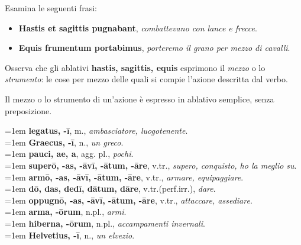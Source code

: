 \documentclass[nols]{tufte-handout}
\newcommand{\textls}[2][5]{%
    \begingroup\addfontfeatures{LetterSpace=#1}#2\endgroup
  }
\renewcommand{\smallcapsspacing}[1]{\textls[10]{#1}}
\renewcommand{\textsc}[1]{\smallcapsspacing{\textsmallcaps{#1}}}
\begin{document}
 Esamina le seguenti frasi:
\begin{itemize}
\item[\textsc{1.}] \textbf{Hastis et sagittis pugnabant}, \textit{combattevano con lance e frecce}.  
\item[\textsc{2.}] \textbf{Equis frumentum portabimus}, \textit{porteremo il grano per mezzo di cavalli}.  
\end{itemize}

Osserva che gli ablativi \textbf{hastis, sagittis, equis} esprimono il \textit{mezzo} o lo \textit{strumento}: 
le cose per mezzo delle quali si compie l'azione descritta dal verbo. 

 Il mezzo o lo strumento di un'azione è espresso in ablativo semplice, senza preposizione.



\begin{multicols}{2}
    \noindent \hangindent=1em \textbf{legatus, -ī}, m., \textit{ambasciatore, luogotenente}.  \\
    \noindent \hangindent=1em \textbf{Graecus, -ī}, n., \textit{un greco}.  \\
    \noindent \hangindent=1em \textbf{pauci, ae, a}, agg. pl., \textit{pochi}.  \\
	
	\noindent \hangindent=1em \textbf{superō, -as, -āvī, -ātum, -āre}, v.tr., \textit{supero, conquisto, ho la meglio su}.  \\
	\noindent \hangindent=1em \textbf{armō, -as, -āvī, -ātum, -āre}, v.tr., \textit{armare, equipaggiare}.  \\
	\noindent \hangindent=1em \textbf{dō, das, dedī, dātum, dāre}, v.tr.(perf.irr.), \textit{dare}.  \\
	\noindent \hangindent=1em \textbf{oppugnō, -as, -āvī, -ātum, -āre}, v.tr., \textit{attaccare, assediare}.  \\
	
	\noindent \hangindent=1em \textbf{arma, -ōrum}, n.pl., \textit{armi}.  \\
	\noindent \hangindent=1em \textbf{hiberna, -ōrum}, n.pl., \textit{accampamenti invernali}.  \\
    \noindent \hangindent=1em \textbf{Helvetius, -ī}, n., \textit{un elvezio}.  \\
	
\end{multicols}
\end{document}
